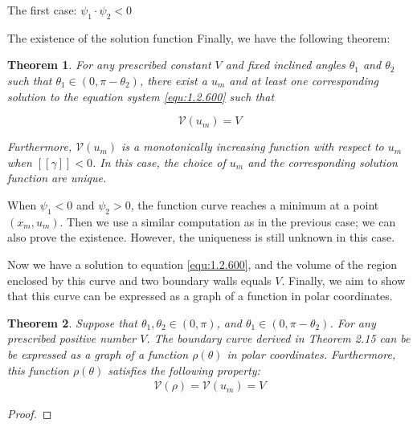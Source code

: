 \documentclass[letterpaper,reqno,10pt,twoside]{amsart}
\newtheorem{theorem}{Theorem}[section]
\theoremstyle{definition}
\theoremstyle{remark}
\begin{document}
\begin{section}{The first case: $\psi_1\cdot \psi_2<0$ }
\begin{subsection}{The existence of the solution function}
  Finally, we have the following theorem:

 \begin{theorem}

    For any prescribed constant $V$ and fixed inclined angles $\theta_1$ and $\theta_2$ such that $\theta_{1}\in(0,\pi-\theta_{2})$, there exist a $u_m$ and at least one corresponding solution to the equation system \eqref{equ:1.2.600} such that 

    \begin{equation*}
        \mathscr{V}(u_{m})=V
    \end{equation*}
    
    Furthermore, $\mathscr{V}(u_{m})$ is a monotonically increasing function with respect to $u_{m}$ when $[\![\gamma]\!]<0$. In this case, the choice of $u_{m}$ and the corresponding solution function are unique.
 \end{theorem}


  When $\psi_1<0$ and $\psi_2>0$, the function curve reaches a minimum at a point $(x_m,u_m)$. Then we use a similar computation as in the previous case; we can also prove the existence. However, the uniqueness is still unknown in this case.
  
  Now we have a solution to equation \eqref{equ:1.2.600}, and the volume of the region enclosed by this curve and two boundary walls equals $V$. Finally, we aim to show that this curve can be expressed as a graph of a function in polar coordinates.

  \begin{theorem}
      Suppose that $\theta_1,\theta_2\in(0,\pi)$, and $\theta_1\in (0,\pi-\theta_2)$. For any prescribed positive number $V$.  The boundary curve derived in Theorem 2.15 can be be expressed as a graph of a function $\rho(\theta)$ in polar coordinates. Furthermore, this function $\rho(\theta)$ satisfies the following property:
      \begin{align}
          \mathcal{V}(\rho)=\mathscr{V}({u_{m}})=V
      \end{align}
  \end{theorem}

  \begin{proof}


\end{proof}
\end{subsection}
\end{section}
\end{document}
